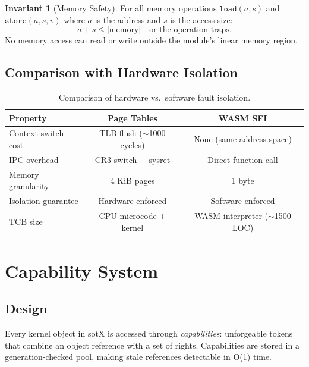 \documentclass[11pt,letterpaper]{article}
\theoremstyle{definition}
\newtheorem{invariant}{Invariant}[section]
\begin{document}
\begin{invariant}[Memory Safety]
For all memory operations $\texttt{load}(a, s)$ and $\texttt{store}(a, s, v)$
where $a$ is the address and $s$ is the access size:
\[
a + s \leq |\text{memory}| \quad \text{or the operation traps.}
\]
No memory access can read or write outside the module's linear memory region.
\end{invariant}

\subsection{Comparison with Hardware Isolation}

\begin{table}[h]
\centering
\begin{tabular}{lcc}
\toprule
\textbf{Property} & \textbf{Page Tables} & \textbf{WASM SFI} \\
\midrule
Context switch cost & TLB flush ($\sim$1000 cycles) & None (same address space) \\
IPC overhead & CR3 switch + sysret & Direct function call \\
Memory granularity & 4 KiB pages & 1 byte \\
Isolation guarantee & Hardware-enforced & Software-enforced \\
TCB size & CPU microcode + kernel & WASM interpreter ($\sim$1500 LOC) \\
\bottomrule
\end{tabular}
\caption{Comparison of hardware vs.\ software fault isolation.}
\label{tab:isolation}
\end{table}

\section{Capability System}
\label{sec:caps}

\subsection{Design}

Every kernel object in sotX is accessed through \emph{capabilities}:
unforgeable tokens that combine an object reference with a set of rights.
Capabilities are stored in a generation-checked pool, making stale references
detectable in O(1) time.
\end{document}
